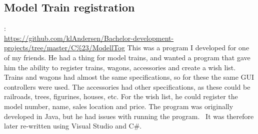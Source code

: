 \subsection{Model Train registration}
\label{sec:model_train}
:  \\
 \url{https://github.com/klAndersen/Bachelor-development-projects/tree/master/C%23/ModellTog}
This was a program I developed for one of my friends. 
He had a thing for model trains, and wanted a program that gave him the ability to register trains, wagons, accessories and create a wish list.
\vspace{0.5em}\newline
Trains and wagons had almost the same specifications, so for these the same GUI controllers were used. 
The accessories had other specifications, as these could be railroads, trees, figurines, houses, etc.
\vspace{0.5em}\newline
For the wish list, he could register the model number, name, sales location and price. 
The program was originally developed in Java, but he had issues with running the program. 
It was therefore later re-written using Visual Studio and C\#.


